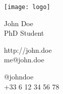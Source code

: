 \documentclass{article}
\begin{document}
\centering \texttt{[image: logo]}\\[-5pt]
\parbox{2in}{\Large \centering John Doe\\[1pt]
\normalsize PhD Student}

\vfill
\raggedright
\begin{multicols}{2}
http://john.doe\\
me@john.doe

\columnbreak
\raggedleft
@johndoe\\
+33 6 12 34 56 78%
\end{multicols}%
\end{document}
